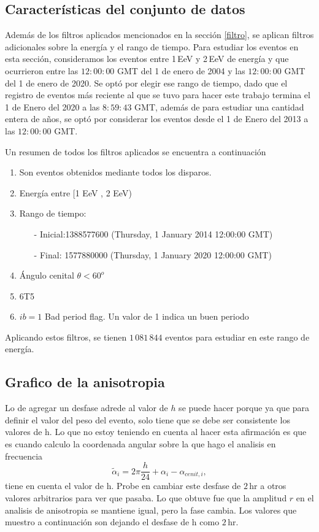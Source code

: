 	\subsection{Características del conjunto de datos} \label{specs}
	

	Además de los filtros aplicados mencionados en la sección \ref{filtro}, se aplican filtros adicionales sobre la energía y el rango de tiempo. Para estudiar los eventos en esta sección, consideramos los eventos entre 1\,EeV y 2\,EeV de energía y que ocurrieron entre las $12:00:00$ GMT del 1 de enero de 2004 y las $12:00:00$ GMT del 1 de enero de 2020. Se optó por elegir ese rango de tiempo, dado que el registro de eventos más reciente al que se tuvo para hacer este trabajo termina el 1 de Enero del 2020   a las $8:59:43$ GMT, además de para estudiar una cantidad entera de años, se optó por considerar los eventos desde el 1 de Enero del 2013 a las $12:00:00 $ GMT.

	Un resumen de todos los filtros aplicados se encuentra a continuación
		\begin{enumerate}
			\item Son eventos obtenidos mediante todos los disparos.
			\item Energía entre  [1 EeV , 2 EeV)
			\item Rango de tiempo:
			\begin{itemize}
				\item[-] Inicial:1388577600 (Thursday, 1 January 2014 12:00:00 GMT)
				\item[-] Final: 1577880000  (Thursday, 1 January 2020 12:00:00 GMT)
			\end{itemize}
			\item Ángulo cenital $\theta < 60^o$
			\item 6T5
			\item $ib=1$ Bad period flag. Un valor de 1 indica un buen periodo
		\end{enumerate}
	Aplicando estos filtros, se tienen $1\,081\,844$ eventos para estudiar en este rango de energía.





\subsection{Grafico de la anisotropia}


		Lo de agregar un desfase adrede al valor de $h$ se puede hacer porque ya que para definir el valor del peso del evento, solo tiene que se debe ser consistente los valores  de h. Lo que no estoy teniendo en cuenta al hacer esta afirmación es que es cuando calculo la coordenada angular sobre la que hago el analisis en frecuencia
		\begin{equation}
			   \tilde{\alpha}_i = 2\pi \frac{h}{24} + \alpha_i -\alpha_{cenit,i},
		\end{equation}
		tiene en cuenta el valor de h. Probe en cambiar este desfase de $2\,$hr a otros valores arbitrarios para ver que pasaba. Lo que obtuve fue que la amplitud $r$ en el analisis de anisotropia se mantiene igual, pero la fase cambia. Los valores que muestro a continuación son dejando el desfase de h como $2\,$hr.
		
